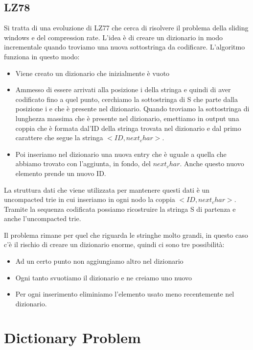 \documentclass[14pt]{extreport}
\begin{document}
\section{LZ78}

Si tratta di una evoluzione di LZ77 che cerca di risolvere il problema della sliding windows e del compression rate.
L'idea è di creare un dizionario in modo incrementale quando troviamo una nuova sottostringa da codificare.
L'algoritmo funziona in questo modo:
\begin{itemize}
\item Viene creato un dizionario che inizialmente è vuoto
\item Ammesso di essere arrivati alla posizione i della stringa e quindi di aver codificato fino a quel punto, cerchiamo la sottostringa di S che parte dalla posizione i e che è presente nel dizionario. Quando troviamo la sottostringa di lunghezza massima che è presente nel dizionario, emettiamo in output una coppia che è formata dal'ID della stringa trovata nel dizionario e dal primo carattere che segue la stringa $<ID, next_char>$. 
\item Poi inseriamo nel dizionario una nuova entry che è uguale a quella che abbiamo trovato con l'aggiunta, in fondo, del $next_char$. Anche questo nuovo elemento prende un nuovo ID.
\end{itemize}

La struttura dati che viene utilizzata per mantenere questi dati è un uncompacted trie in cui inseriamo in ogni nodo la coppia $<ID, next_char>$. 
Tramite la sequenza codificata possiamo ricostruire la stringa S di partenza e anche l'uncompacted trie.


Il problema rimane per quel che riguarda le stringhe molto grandi, in questo caso c'è il rischio di creare un dizionario enorme, quindi ci sono tre possibilità:
\begin{itemize}
\item Ad un certo punto non aggiungiamo altro nel dizionario
\item Ogni tanto svuotiamo il dizionario e ne creiamo uno nuovo
\item Per ogni inserimento eliminiamo l'elemento usato meno recentemente nel dizionario.
\end{itemize}


\chapter{Dictionary Problem}
\end{document}
